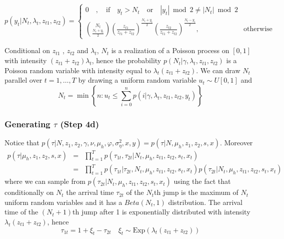 \documentclass[12pt]{article}
\begin{document}
\begin{equation}
p\left( y_t | N_t, \lambda_t, z_{t1} ,z_{t2}\right) =\begin{cases}
    0\quad,\quad  \text{if}  \quad  y_t > N_t \quad \text{or}\quad |y_t| \bmod 2\neq |N_t| \bmod 2 &    \\
    \displaystyle \binom{N_t}{\frac{N_t+y_t}{2}} \left(\frac{z_{t1} }{z_{t1}+z_{t2}} \right)^{\frac{N_t+y_t}{2}}\left(\frac{z_{t2} }{z_{t1}+z_{t2}} \right)^{\frac{N_t-y_t}{2}} , & \text{otherwise}
  \end{cases}
\end{equation}

Conditional  on $z_{t1}$ , $z_{t2}$
and  $\lambda_t$, $N_t$ is a realization of a Poisson process on $[0,1]$ with intensity $(z_{t1}+z_{t2})\lambda_t$, hence the probability $p(  N_t| \gamma, \lambda_t ,z_{t1} ,z_{t2}) $  is a Poisson random variable with intensity equal to $\lambda_t ( z_{t1}+z_{t2})$.
We can draw $N_t $ parallel over $t= 1, \ldots, T$ by drawing a uniform random variable $u_t \sim U[0,1]$ and 
\begin{equation}
N_t = \min  \left\{ n : u_t \leq \sum \limits_{i=0}^{n} p( i  | \gamma, \lambda_t ,z_{t1} ,z_{t2}, y_t )  \right\}
\end{equation}



\subsubsection*{Generating $\tau $ (Step 4d) }
Notice that $p( \tau |N, z_1 , z_2,\gamma,\nu,\mu_{h} ,\varphi,\sigma^{2}_{\eta},x,y )= p(\tau|N, \mu_{h},z_1, z_2,s, x)$. Moreover
\begin{eqnarray}
p(\tau| \mu_{h},z_1, z_2,s, x)&=& \prod \limits_{t=1}^{T} p(\tau_{1t}, \tau_{2t}| N_t,\mu_{h},z_{t1}, z_{t2}, s_t,x_t )\nonumber \\
&=&  \prod \limits_{t=1}^{T} p(\tau_{1t}|  \tau_{2t}, N_t, \mu_{h},z_{t1}, z_{t2},s_t, x_t )p(\tau_{2t}| N_t, \mu_{h},z_{t1}, z_{t2},s_t, x_t ) \nonumber
\end{eqnarray}
where we can sample from $p(\tau_{2t}| N_t, \mu_{h},z_{t1}, z_{t2},s_t, x_t )$ using the fact that conditionally on $N_t$ the arrival time $\tau_{2t}$ of the $N_t$th jump is the maximum of $N_t$ uniform random variables and it has a $Beta(N_t,1)$ distribution. The arrival time of the $(N_t +1)$th jump after 1 is exponentially distributed with intensity $\lambda_t (z_{t1}+z_{t2})$, hence
\begin{equation}
\tau_{1t} = 1+\xi_t-\tau_{2t} \quad \xi_t \sim \text{Exp}(\lambda_t (z_{t1}+z_{t2}))
\end{equation}
\end{document}
